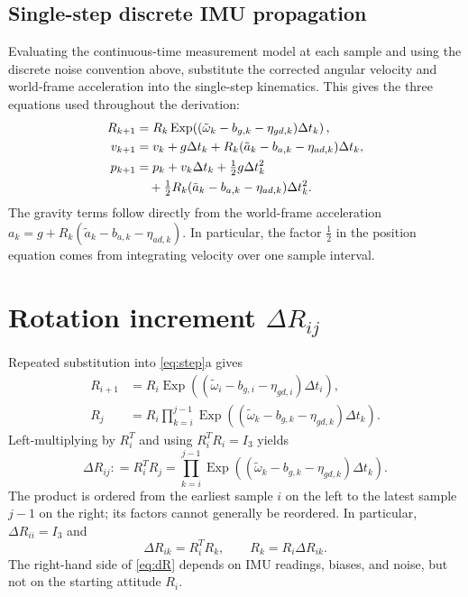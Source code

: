 \documentclass[11pt,a4paper]{article}
\newcommand{\Exp}{\operatorname{Exp}}
\newcommand{\defeq}{\mathrel{\mathop:}=}
\begin{document}
\subsection{Single-step discrete IMU propagation}
Evaluating the continuous-time measurement model at each sample and
using the discrete noise convention above, substitute the corrected
angular velocity and world-frame acceleration into the single-step
kinematics. This gives the three equations used throughout the derivation:
\begin{subequations}\label{eq:step}
\begin{align}
R_{k+1}&=R_k\Exp\!\left((\tilde\omega_k-b_{g,k}-\eta_{gd,k})\Delta t_k\right),\\
v_{k+1}&=v_k+g\Delta t_k
 +R_k(\tilde a_k-b_{a,k}-\eta_{ad,k})\Delta t_k,\\
p_{k+1}&=p_k+v_k\Delta t_k+\tfrac12g\Delta t_k^2\notag\\
&\quad+\tfrac12R_k(\tilde a_k-b_{a,k}-\eta_{ad,k})\Delta t_k^2.
\end{align}
\end{subequations}
The gravity terms follow directly from the world-frame acceleration
$a_k=g+R_k(\tilde a_k-b_{a,k}-\eta_{ad,k})$.
In particular, the factor $\tfrac12$ in the position equation comes
from integrating velocity over one sample interval.

\section{Rotation increment $\Delta R_{ij}$}
Repeated substitution into \eqref{eq:step}a gives
\begin{align*}
R_{i+1}&=R_i\Exp((\tilde\omega_i-b_{g,i}-\eta_{gd,i})\Delta t_i),\\
R_j&=R_i\prod_{k=i}^{j-1}
\Exp((\tilde\omega_k-b_{g,k}-\eta_{gd,k})\Delta t_k).
\end{align*}
Left-multiplying by $R_i^T$ and using $R_i^TR_i=I_3$ yields
\begin{equation}\label{eq:dR}
\boxed{\Delta R_{ij}\defeq R_i^TR_j=\prod_{k=i}^{j-1}\Exp\!\left((\tilde\omega_k-b_{g,k}-\eta_{gd,k})\Delta t_k\right).}
\end{equation}
The product is ordered from the earliest sample $i$ on the left to the latest sample $j-1$ on the right; its factors cannot generally be reordered. In particular, $\Delta R_{ii}=I_3$ and
\begin{equation}\label{eq:Rk}
\Delta R_{ik}=R_i^TR_k,\qquad R_k=R_i\Delta R_{ik}.
\end{equation}
The right-hand side of \eqref{eq:dR} depends on IMU readings, biases, and noise, but not on the starting attitude $R_i$.
\end{document}
